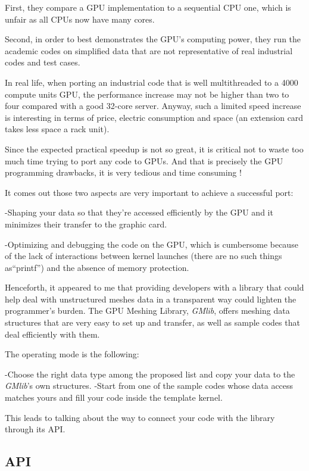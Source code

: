 \documentclass[a4paper,12pt]{article}
\begin{document}
First, they compare a GPU implementation to a sequential CPU one, which is unfair as all CPUs now have many cores.

Second, in order to best demonstrates the GPU's computing power, they run the academic codes on simplified data that are not representative of real industrial codes and test cases.

In real life, when porting an industrial code that is well multithreaded to a 4000 compute units GPU, the performance increase may not be higher than two to four compared with a good 32-core server. Anyway, such a limited speed increase is interesting in terms of price, electric consumption and space (an extension card takes less space a rack unit).

Since the expected practical speedup is not so great, it is critical not to waste too much time trying to port any code to GPUs. And that is precisely the GPU programming drawbacks, it is very tedious and time consuming !

It comes out those two aspects are very important to achieve a successful port:

-Shaping your data so that they're accessed efficiently by the GPU and it minimizes their transfer to the graphic card.

-Optimizing and debugging the code on the GPU, which is cumbersome because of the lack of interactions between kernel launches (there are no such things as``printf'') and the absence of memory protection.

Henceforth, it appeared to me that providing developers with a library that could help deal with unstructured meshes data in a transparent way could lighten the programmer's burden. The GPU Meshing Library, \emph{GMlib}, offers meshing data structures that are very easy to set up and transfer, as well as sample codes that deal efficiently with them.

The operating mode is the following:

-Choose the right data type among the proposed list and copy your data to the \emph{GMlib}'s own structures.
-Start from one of the sample codes whose data access matches yours and fill your code inside the template kernel.

This leads to talking about the way to connect your code with the library through its API.


\subsection{API}
\end{document}
